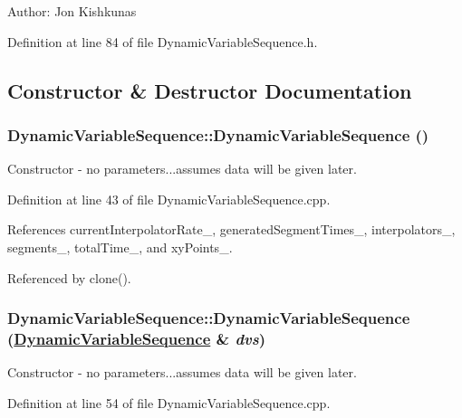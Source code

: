 \begin{Desc}
\item[Author:]Jon Kishkunas \end{Desc}




Definition at line 84 of file Dynamic\-Variable\-Sequence.h.

\subsection{Constructor \& Destructor Documentation}
\hypertarget{classDynamicVariableSequence_a0}{
\subsubsection[DynamicVariableSequence]{\setlength{\rightskip}{0pt plus 5cm}Dynamic\-Variable\-Sequence::Dynamic\-Variable\-Sequence ()}}
\label{classDynamicVariableSequence_a0}


Constructor - no parameters...assumes data will be given later. 



Definition at line 43 of file Dynamic\-Variable\-Sequence.cpp.

References current\-Interpolator\-Rate\_\-, generated\-Segment\-Times\_\-, interpolators\_\-, segments\_\-, total\-Time\_\-, and xy\-Points\_\-.

Referenced by clone().\hypertarget{classDynamicVariableSequence_a1}{
\subsubsection[DynamicVariableSequence]{\setlength{\rightskip}{0pt plus 5cm}Dynamic\-Variable\-Sequence::Dynamic\-Variable\-Sequence (\hyperlink{classDynamicVariableSequence}{Dynamic\-Variable\-Sequence} \& {\em dvs})}}
\label{classDynamicVariableSequence_a1}


Constructor - no parameters...assumes data will be given later. 



Definition at line 54 of file Dynamic\-Variable\-Sequence.cpp.

